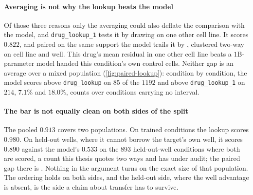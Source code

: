 \paragraph{Averaging is not why the lookup beats the model} Of those three
reasons only the averaging could also deflate the comparison with the model, and
\texttt{drug\_lookup\_1} tests it by drawing on one other cell line. It scores
$0.822$, and paired on the same support the model trails it by
, clustered two-way on cell line and well. This
drug's mean residual in one other cell line beats a $1$B-parameter model handed
this condition's own control cells. Neither gap is an average over a mixed
population (\cref{fig:paired-lookup}): condition by condition, the model scores
above \texttt{drug\_lookup} on $85$ of the $\num{1192}$ and above
\texttt{drug\_lookup\_1} on $214$, $7.1\%$ and $18.0\%$, counts over conditions
carrying no interval.

\paragraph{The bar is not equally clean on both sides of the split} The pooled
$0.913$ covers two populations. On trained conditions the lookup scores $0.980$.
On held-out wells, where it cannot borrow the target's own well, it scores
$0.890$ against the model's $0.533$ on the 893 held-out-well
conditions where both are scored, a count this thesis quotes two ways and has
under audit; the paired gap there is . Nothing in the
argument turns on the exact size of that population. The ordering holds on both
sides, and the held-out side, where the well advantage is absent, is the side a
claim about transfer has to survive.

